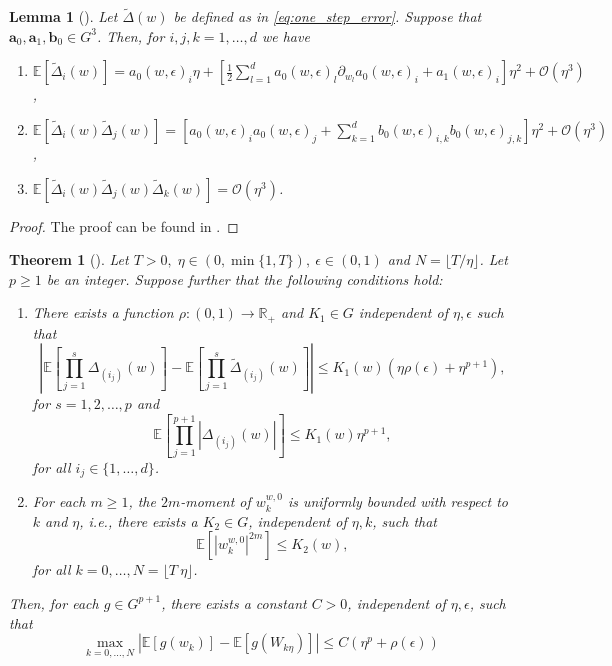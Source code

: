 \documentclass[12pt]{article}
\newtheorem{theorem}{Theorem}[section]
\newtheorem{lemma}[lemma]{Lemma}
\theoremstyle{definition}
\numberwithin{equation}{section}
\newcommand{\R}{\mathbb{R}}
\newcommand{\ev}[1]{\mathbb{E}\left[{#1}\right]}
\begin{document}
\begin{lemma}[]
  \label{lem:sde_one_step}
  Let $ \widetilde{\Delta}(w)$ be defined as in \eqref{eq:one_step_error}. Suppose that $\mathbf{a}_0, \mathbf{a}_1, \mathbf{b}_0 \in G^3$. Then, for $i,j,k = 1,\dots, d$ we have
  \begin{enumerate}[label=(\roman*)]
    \item  $\ev{\widetilde{\Delta}_{i}(w)} = a_{0}(w,\epsilon)_{i}\eta + \left[\frac{1}{2}\sum_{l=1}^d a_{0}(w,\epsilon)_{l}\partial_{w_l}a_0(w,\epsilon)_{i} + a_1(w,\epsilon)_{i}\right] \eta^2 + \mathcal{O}(\eta^3)$,
    \item $\ev{\widetilde{\Delta}_{i}(w)\widetilde{\Delta}_{j}(w)} = \left[a_0(w, \epsilon)_{i}a_0(w,\epsilon)_{j} + \sum_{k=1}^db_0(w, \epsilon)_{i,k}b_0(w,\epsilon)_{j,k}\right]\eta^2 + \mathcal{O}(\eta^3)$,
    \item $\ev{\widetilde{\Delta}_{i}(w)\widetilde{\Delta}_{j}(w)\widetilde{\Delta}_{k}(w)} = \mathcal{O}(\eta^3)$.
  \end{enumerate}
\end{lemma}
\begin{proof}
  The proof can be found in \cite[Lemma 4]{liStochasticModifiedEquations2019}.
\end{proof}
\begin{theorem}[]
  \label{thm:approximation}
  Let $T > 0, \; \eta \in (0,\min\{1,T\}), \: \epsilon \in (0,1)$ and $N = \lfloor T / \eta \rfloor$. Let $p \geq 1$ be an integer. Suppose further that the following conditions hold:
  \begin{enumerate}[label=(\roman*)]
    \item There exists a function $\rho : (0,1) \rightarrow \R_+$ and $K_1 \in G$ independent of $\eta, \epsilon$ such that
    \begin{equation*}
      \left\lvert \ev{\prod_{j=1}^s \Delta_{(i_j)}(w)} - \ev{\prod_{j=1}^s \tilde{\Delta}_{(i_j)}(w)}\right\rvert \leq K_1(w)(\eta \rho(\epsilon) + \eta^{p+1}),
    \end{equation*}
    for $s=1,2,\dots,p$ and
    \begin{equation*}
      \ev{\prod_{j=1}^{p+1}\left\lvert \Delta_{(i_j)}(w)\right\rvert} \leq K_1(w)\eta^{p+1},
    \end{equation*}
    for all $i_j \in \{1,\dots,d\}$.
    \item For each $m \geq 1$, the $2m$-moment of $w_k^{w,0}$ is uniformly bounded with respect to $k$ and $\eta$, i.e., there exists a $K_2 \in G$, independent of $\eta, k$, such that
    \begin{equation*}
      \ev{\left\lvert w_k^{w,0} \right\rvert^{2m}} \leq K_2(w),
    \end{equation*}
    for all $k = 0, \dots, N = \lfloor T\ \eta \rfloor$.
  \end{enumerate}
  Then, for each $g \in G^{p + 1}$, there exists a constant $C > 0$, independent of $\eta, \epsilon$, such that
  \begin{equation*}
    \max_{k=0,\dots,N}|\ev{g(w_k)} - \ev{g(W_{k\eta})}|\leq C(\eta^{p} + \rho(\epsilon))
  \end{equation*}
\end{theorem}
\end{document}

